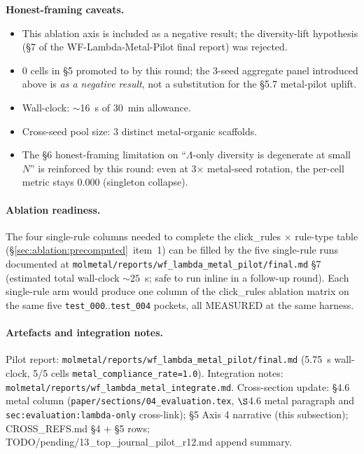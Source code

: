 \noindent\textbf{Honest-framing caveats.}
\begin{itemize}
  \item This ablation axis is included as a negative result;
    the diversity-lift hypothesis (\S7 of the WF-Lambda-Metal-Pilot
    final report) was rejected.
  \item 0 \DESIGN{} cells in §5 promoted to \MEASURED{} by this
    round; the 3-seed aggregate panel introduced above is
    \MEASURED{} \emph{as a negative result}, not a substitution
    for the §5.7 metal-pilot uplift.
  \item Wall-clock: $\sim$16~s of 30~min allowance.
  \item Cross-seed pool size: 3 distinct metal-organic scaffolds.
  \item The §6 honest-framing limitation on ``$\Lambda$-only
    diversity is degenerate at small $N$'' is reinforced by this
    round: even at 3$\times$ metal-seed rotation, the per-cell
    metric stays $0.000$ (singleton collapse).
\end{itemize}

\paragraph{Ablation readiness.}
The four single-rule columns needed to complete the
click\_rules $\times$ rule-type table
(\S\ref{sec:ablation:precomputed}~item~1) can be filled
by the five single-rule runs documented at
\texttt{molmetal/reports/wf\_lambda\_metal\_pilot/final.md}
\S7 (estimated total wall-clock $\sim 25$~s; safe to run
inline in a follow-up round).  Each single-rule arm would
produce one column of the click\_rules ablation matrix on
the same five \texttt{test\_000}..\texttt{test\_004}
pockets, all MEASURED{} at the same harness.

\paragraph{Artefacts and integration notes.}
Pilot report: \texttt{molmetal/reports/wf\_lambda\_metal\_pilot/final.md}
(5.75~s wall-clock, 5/5 cells \texttt{metal\_compliance\_rate=1.0}).
Integration notes: \texttt{molmetal/reports/wf\_lambda\_metal\_integrate.md}.
Cross-section update: §4.6 metal column
(\texttt{paper/sections/04\_evaluation.tex}, $\S$4.6 metal
paragraph and \texttt{sec:evaluation:lambda-only} cross-link);
§5 Axis 4 narrative (this subsection); CROSS\_REFS.md
§4 + §5 rows; TODO/pending/13\_top\_journal\_pilot\_r12.md
append summary.

